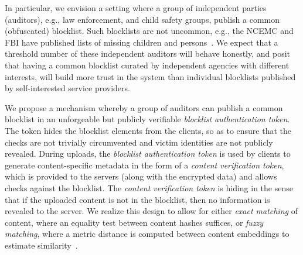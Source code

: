 

In particular, we envision
a setting where a group of independent parties (auditors), e.g., law enforcement,
and child safety groups, publish a common (obfuscated) blocklist. Such blocklists are
not uncommon, e.g., the NCEMC and FBI have published lists of missing
children and persons~\cite{ncemc}. We 
expect that a threshold number of these independent auditors will behave honestly, and posit that having a common blocklist curated by independent
agencies with different interests, will build more trust in the system
than individual blocklists published by self-interested service
providers. 

We propose a mechanism whereby a group of
auditors can publish a common blocklist in an unforgeable but publicly verifiable
\emph{blocklist authentication token}. The token hides the blocklist elements from the clients, so 
as to ensure that the checks are not trivially circumvented and victim identities are not 
publicly revealed. During uploads, the \emph{blocklist authentication token} is
used by clients to generate content-specific metadata
in the form of a \emph{content verification token}, which is provided to the servers (along with the encrypted data)
and allows checks against the blocklist. The
\emph{content verification token} is hiding in the sense that if the uploaded content is
not in the blocklist, then no information is revealed to the server.
We realize this design to allow for either \emph{exact matching} of content, where an equality test between
content hashes suffices, or \emph{fuzzy matching}, where a metric
distance is computed between content embeddings to estimate
similarity~\cite{yang2025certphash}.






%



